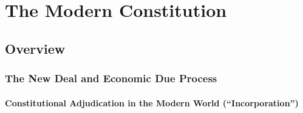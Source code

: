 \section{The Modern Constitution}

\subsection{Overview}

\subsubsection{The New Deal and Economic Due Process}

\paragraph{Constitutional Adjudication in the Modern World 
(``Incorporation'')}


